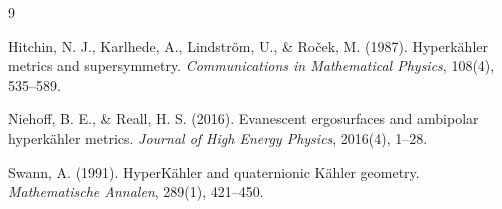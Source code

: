 \documentclass[11pt]{article}
\begin{document}
\begin{thebibliography}{9}

Hitchin, N. J., Karlhede, A., Lindström, U., \& Roček, M. (1987). 
Hyperkähler metrics and supersymmetry. 
\textit{Communications in Mathematical Physics}, 108(4), 535–589. 

Niehoff, B. E., \& Reall, H. S. (2016). 
Evanescent ergosurfaces and ambipolar hyperkähler metrics. 
\textit{Journal of High Energy Physics}, 2016(4), 1–28.

Swann, A. (1991). 
HyperKähler and quaternionic Kähler geometry. 
\textit{Mathematische Annalen}, 289(1), 421–450. 

\end{thebibliography}
\end{document}
